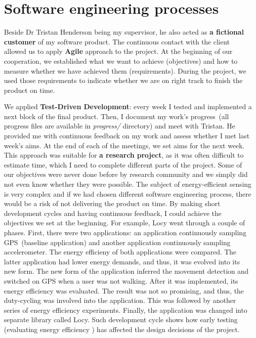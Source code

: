 \section{Software engineering processes}
\label{s:processes}
\hspace{10pt} Beside Dr Tristan Henderson being my supervisor, he also acted as \textbf{a fictional customer} of my software product. The continuous contact with the client allowed us to apply \textbf{Agile} approach to the project. At the beginning of our cooperation,  we established what we want to achieve (objectives) and how to measure whether we have achieved them (requirements). During the project, we used those requirements to indicate whether we are on right track to finish the product on time.

We applied \textbf{Test-Driven Development}: every week I tested and implemented a next block of the final product. Then, I document my work's progress\ (all progress files are available in \textit{progress/} directory) and meet with Tristan. He provided me with continuous feedback on my work and assess whether I met last week's aims. At the end of each of the meetings, we set aims for the next week. This approach was suitable for \textbf{a research project}, as it was often difficult to estimate time, which I need to complete different parts of the project. Some of our objectives were never done before by research community and we simply did not even know whether they were possible. The subject of energy-efficient sensing is very complex and if we had chosen different software engineering process, there would be a risk of not delivering the product on time. By making short development cycles and having continuous feedback, I could achieve the objectives we set at the beginning. For example, Locy went through a couple of phases. First, there were two applications: an application continuously sampling GPS\ (baseline application) and another application continuously sampling accelerometer. The energy efficieny of both applications were compared. The latter application had lower energy demands, and thus, it was evolved into its new form. The new form of the application inferred the movement detection and switched on GPS when a user was not walking. After it was implemented, its energy efficiency was evaluated. The result was not so promising, and thus, the duty-cycling was involved into the application. This was followed by another series of energy efficiency experiments. Finally, the application was changed into separate library called Locy. Such development cycle shows how early testing (evaluating energy efficiency ) has affected the design decisions of the project.
			
